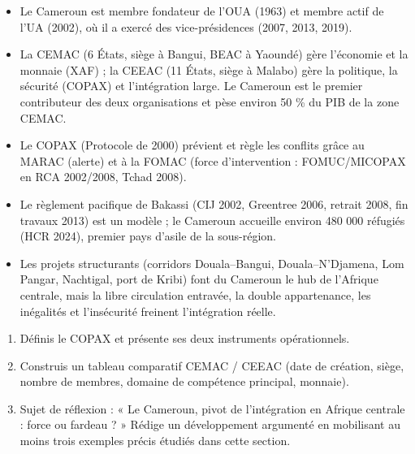 \documentclass[11pt]{article}
\newcommand{\cle}[1]{{\popxbold\color{popdark}#1}}
\begin{document}
\begin{aretenir}
\begin{itemize}
\item Le Cameroun est membre fondateur de l'OUA (1963) et membre actif de l'UA (2002), où il a exercé des vice-présidences (2007, 2013, 2019).
\item La \cle{CEMAC} (6 États, siège à Bangui, BEAC à Yaoundé) gère l'économie et la monnaie (XAF) ; la \cle{CEEAC} (11 États, siège à Malabo) gère la politique, la sécurité (COPAX) et l'intégration large. Le Cameroun est le premier contributeur des deux organisations et pèse environ 50 \% du PIB de la zone CEMAC.
\item Le \cle{COPAX} (Protocole de 2000) prévient et règle les conflits grâce au MARAC (alerte) et à la FOMAC (force d'intervention : FOMUC/MICOPAX en RCA 2002/2008, Tchad 2008).
\item Le règlement pacifique de Bakassi (CIJ 2002, Greentree 2006, retrait 2008, fin travaux 2013) est un modèle ; le Cameroun accueille environ 480 000 réfugiés (HCR 2024), premier pays d'asile de la sous-région.
\item Les projets structurants (corridors Douala--Bangui, Douala--N'Djamena, Lom Pangar, Nachtigal, port de Kribi) font du Cameroun le hub de l'Afrique centrale, mais la libre circulation entravée, la double appartenance, les inégalités et l'insécurité freinent l'intégration réelle.
\end{itemize}
\end{aretenir}

\begin{exercice}
\begin{enumerate}
\item Définis le COPAX et présente ses deux instruments opérationnels.
\item Construis un tableau comparatif CEMAC / CEEAC (date de création, siège, nombre de membres, domaine de compétence principal, monnaie).
\item Sujet de réflexion : « Le Cameroun, pivot de l'intégration en Afrique centrale : force ou fardeau ? » Rédige un développement argumenté en mobilisant au moins trois exemples précis étudiés dans cette section.
\end{enumerate}
\end{exercice}
\end{document}
